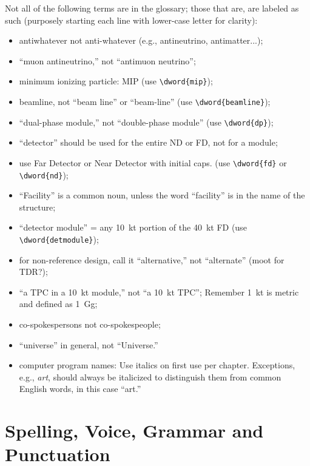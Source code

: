 Not all of the following terms are in the glossary; those that are, are labeled as such (purposely starting each line with lower-case letter for clarity):
\begin{itemize}
\item antiwhatever not anti-whatever (e.g., antineutrino, antimatter...);
\item ``muon antineutrino,'' not ``antimuon neutrino'';
\item minimum ionizing particle: MIP (use \verb|\dword{mip}|);
\item beamline, not ``beam line'' or ``beam-line'' (use \verb|\dword{beamline}|);
\item ``dual-phase module,'' not ``double-phase module'' (use \verb|\dword{dp}|);
\item ``detector'' should be used for the entire ND or FD, not for a module;
\item use Far Detector or Near Detector with initial caps. (use \verb|\dword{fd}| or \verb|\dword{nd}|);
\item  ``Facility'' is a common noun, unless the word ``facility'' is in the name of the structure;
\item ``detector module'' = any \SI{10}{kt} portion of the \SI{40}{kt} FD (use \verb|\dword{detmodule}|);
\item for non-reference design, call it ``alternative,'' not ``alternate'' (moot for TDR?);
\item ``a TPC in a \SI{10}{kt} module,'' not ``a \SI{10}{kt}  TPC''; Remember \SI{1}{kt} is metric and defined as \SI{1}{Gg};
\item co-spokespersons not co-spokespeople;
\item ``universe'' in general, not ``Universe.''
\item computer program names: Use italics on first use per chapter. Exceptions, e.g., \textit{art}, should always be italicized to distinguish them from common English words, in this case ``art.''
\end{itemize}

\section{Spelling, Voice, Grammar and Punctuation}
\label{sec:english-spelling}

